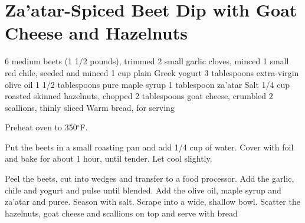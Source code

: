 \section{Za'atar-Spiced Beet Dip with Goat Cheese and Hazelnuts}
\begin{recipe}
	
	
	
	
	6 medium beets (1 1/2 pounds), trimmed 2 small garlic cloves, minced 1 small red chile, seeded and minced 1 cup plain Greek yogurt 3 tablespoons extra-virgin olive oil 1 1/2 tablespoons pure maple syrup 1 tablespoon za’atar Salt 1/4 cup roasted skinned hazelnuts, chopped 2 tablespoons goat cheese, crumbled 2 scallions, thinly sliced Warm bread, for serving 
	
	
	
	
	Preheat oven to 350$^{\circ}$F. 
	
	Put the beets in a small roasting pan and add 1/4 cup of water. Cover with foil and bake for about 1 hour, until tender. Let cool slightly.

	Peel the beets, cut into wedges and transfer to a food processor. Add the garlic, chile and yogurt and pulse until blended. Add the olive oil, maple syrup and za’atar and puree. Season with salt. Scrape into a wide, shallow bowl. Scatter the hazelnuts, goat cheese and scallions on top and serve with bread

	
\end{recipe}

